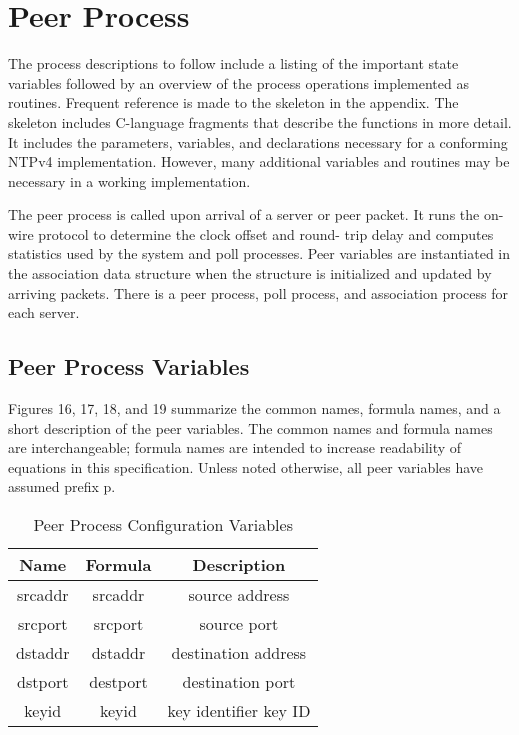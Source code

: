 \chapter{Peer Process}
\label{section-9}

The process descriptions to follow include a listing of the important
state variables followed by an overview of the process operations
implemented as routines. Frequent reference is made to the skeleton
in the appendix. The skeleton includes C-language fragments that
describe the functions in more detail. It includes the parameters,
variables, and declarations necessary for a conforming NTPv4
implementation. However, many additional variables and routines may
be necessary in a working implementation.

The peer process is called upon arrival of a server or peer packet.
It runs the on-wire protocol to determine the clock offset and round-
trip delay and computes statistics used by the system and poll
processes. Peer variables are instantiated in the association data
structure when the structure is initialized and updated by arriving
packets. There is a peer process, poll process, and association
process for each server.

\section{Peer Process Variables}
\label{section-9-1}

Figures 16, 17, 18, and 19 summarize the common names, formula names,
and a short description of the peer variables. The common names and
formula names are interchangeable; formula names are intended to
increase readability of equations in this specification. Unless
noted otherwise, all peer variables have assumed prefix p.

\begin{table}[htb]
\center
\begin{tabular}{c | c | c}
Name & Formula & Description \\
\hline
\hline
srcaddr & srcaddr & source address \\
srcport & srcport & source port \\
dstaddr & dstaddr & destination address \\
dstport & destport & destination port \\
keyid & keyid & key identifier key ID \\
\hline
\end{tabular}
\label{peer_process_configuration_variables}
\caption{Peer Process Configuration Variables}
\end{table}

